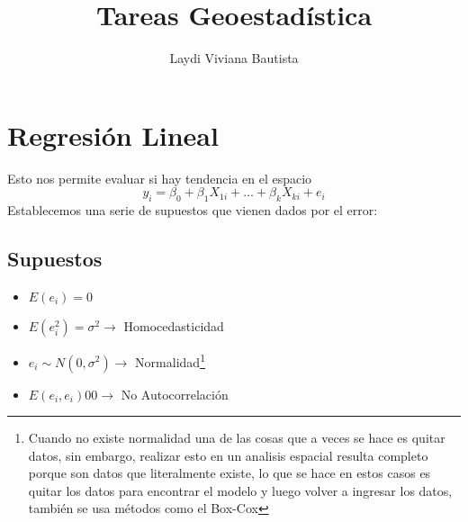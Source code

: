 \documentclass{book}
\title{Tareas Geoestadística}
\author{Laydi Viviana Bautista}
\begin{document}
\section{Regresión Lineal}
Esto nos permite evaluar si hay tendencia en el espacio
$$y_i = \beta_0 + \beta_1 X_{1i} + ... + \beta_k X_{ki} + e_i$$
Establecemos una serie de supuestos que vienen dados por el error:

\subsection{Supuestos}

\begin{itemize}
    \item $E(e_i)=0$
    \item $E(e_i^2)=\sigma^2 \longrightarrow$  Homocedasticidad
    \item $e_i \sim N(0, \sigma^2) \longrightarrow$  Normalidad\footnote{Cuando no existe normalidad una de las cosas que a veces se hace es quitar datos, sin embargo, realizar esto en un analisis espacial resulta completo porque son datos que literalmente existe, lo que se hace en estos casos es quitar los datos para encontrar el modelo y luego volver a ingresar los datos, también se usa métodos como el Box-Cox}
    \item $E(e_i,e_i) 0 0 \longrightarrow$  No Autocorrelación
    
\end{itemize}
\end{document}
